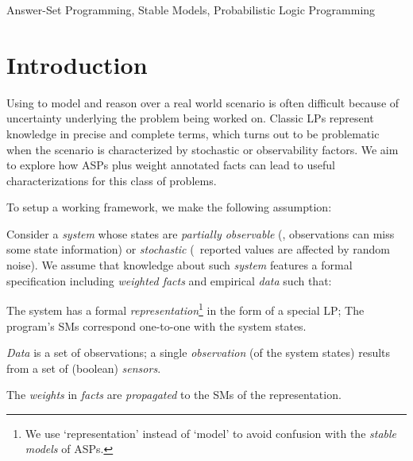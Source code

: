 \documentclass[x11names]{tlp}
\begin{document}
\begin{keywords}
	Answer-Set Programming, Stable Models, Probabilistic Logic Programming
\end{keywords}

\section{Introduction}
\label{sec:introduction}

\noindent Using  to model and reason over a real world scenario is often difficult because of uncertainty underlying the problem being worked on.
Classic \acp{LP} represent knowledge in precise and complete terms, which turns out to be problematic when the scenario is characterized by stochastic or observability factors.
%
%
We aim to explore how \acp{ASP} plus weight annotated facts can lead to useful characterizations for this class of problems.

To setup a working framework, we make the following assumption:
\begin{assumption}\label{asp:system.representation.data}
	Consider a \emph{system} whose states are \emph{partially observable} (\ie, observations can miss some state information) or \emph{stochastic} (\ie\ reported values are affected by random noise).
	We assume that knowledge about such \emph{system} features a formal specification including \emph{weighted facts} and empirical \emph{data} such that:
	\begin{description}\tight
		\item[(Representation)]
		The system has a formal \emph{representation}\footnote{We use `representation' instead of `model' to avoid confusion with the \emph{stable models} of \aclp{ASP}.} in the form of a special \acl{LP};
		The program's \aclp*{SM} correspond one-to-one with the system states.
		\item[(Data)] \emph{Data} is a set of observations; a single \emph{observation} (of the system states) results from a set of (boolean) \emph{sensors}.
		\item[(Propagation)]
		The \emph{weights} in \emph{facts} are \emph{propagated} to the \aclp{SM} of the representation.
	\end{description}
\end{assumption}
\end{document}
